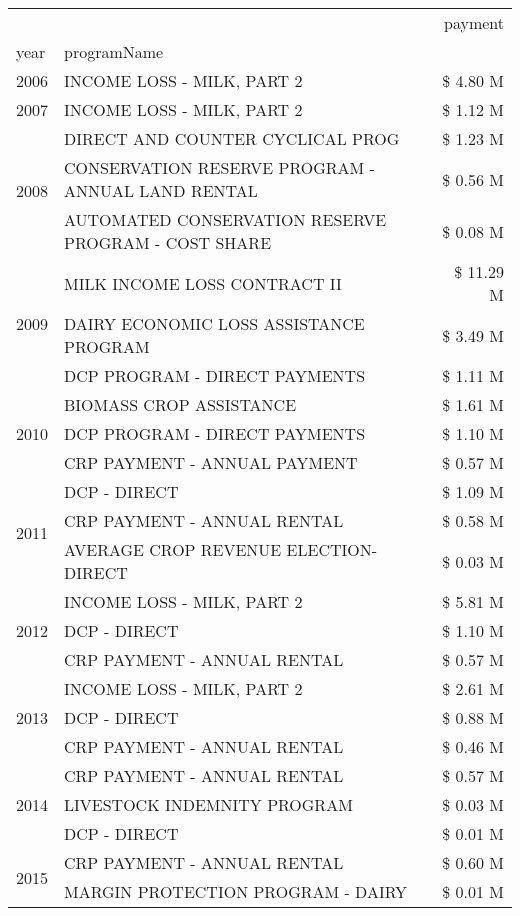 \begin{tabular}{llr}
\toprule
 &  & payment \\
year & programName &  \\
\midrule
2006 & INCOME LOSS - MILK, PART 2 & \$ 4.80 M \\
\cline{1-3}
2007 & INCOME LOSS - MILK, PART 2 & \$ 1.12 M \\
\cline{1-3}
\multirow[t]{3}{*}{2008} & DIRECT AND COUNTER CYCLICAL PROG & \$ 1.23 M \\
 & CONSERVATION RESERVE PROGRAM - ANNUAL LAND RENTAL & \$ 0.56 M \\
 & AUTOMATED CONSERVATION RESERVE PROGRAM - COST SHARE & \$ 0.08 M \\
\cline{1-3}
\multirow[t]{3}{*}{2009} & MILK INCOME LOSS CONTRACT II & \$ 11.29 M \\
 & DAIRY ECONOMIC LOSS ASSISTANCE PROGRAM & \$ 3.49 M \\
 & DCP PROGRAM - DIRECT PAYMENTS & \$ 1.11 M \\
\cline{1-3}
\multirow[t]{3}{*}{2010} & BIOMASS CROP ASSISTANCE & \$ 1.61 M \\
 & DCP PROGRAM - DIRECT PAYMENTS & \$ 1.10 M \\
 & CRP PAYMENT - ANNUAL PAYMENT & \$ 0.57 M \\
\cline{1-3}
\multirow[t]{3}{*}{2011} & DCP - DIRECT & \$ 1.09 M \\
 & CRP PAYMENT - ANNUAL RENTAL & \$ 0.58 M \\
 & AVERAGE CROP REVENUE ELECTION-DIRECT & \$ 0.03 M \\
\cline{1-3}
\multirow[t]{3}{*}{2012} & INCOME LOSS - MILK, PART 2 & \$ 5.81 M \\
 & DCP - DIRECT & \$ 1.10 M \\
 & CRP PAYMENT - ANNUAL RENTAL & \$ 0.57 M \\
\cline{1-3}
\multirow[t]{3}{*}{2013} & INCOME LOSS - MILK, PART 2 & \$ 2.61 M \\
 & DCP - DIRECT & \$ 0.88 M \\
 & CRP PAYMENT - ANNUAL RENTAL & \$ 0.46 M \\
\cline{1-3}
\multirow[t]{3}{*}{2014} & CRP PAYMENT - ANNUAL RENTAL & \$ 0.57 M \\
 & LIVESTOCK INDEMNITY PROGRAM & \$ 0.03 M \\
 & DCP - DIRECT & \$ 0.01 M \\
\cline{1-3}
\multirow[t]{3}{*}{2015} & CRP PAYMENT - ANNUAL RENTAL & \$ 0.60 M \\
 & MARGIN PROTECTION PROGRAM - DAIRY & \$ 0.01 M \\

\end{tabular}
